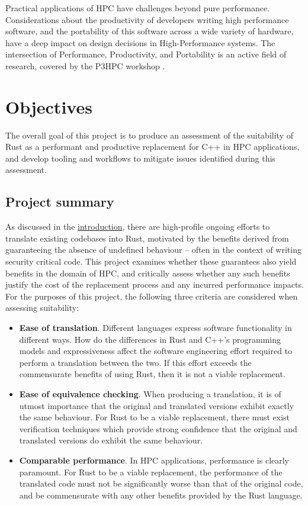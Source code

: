 Practical applications of \acrshort{HPC} have challenges beyond pure performance. Considerations about the productivity of developers writing high performance software, and the portability of this software across a wide variety of hardware, have a deep impact on design decisions in High-Performance systems. The intersection of Performance, Productivity, and Portability is an active field of research, covered by the \acrfull{P3HPC} workshop \cite{P3HPC}.



\section{Objectives}
\label{sec:objectives}

The overall goal of this project is to produce an assessment of the suitability of Rust as a performant and productive replacement for C++ in \acrshort{HPC} applications, and develop tooling and workflows to mitigate issues identified during this assessment.

\subsection{Project summary}
\label{ssec:objectives-summary}

As discussed in the \hyperref[ch:introduction]{introduction}, there are high-profile ongoing efforts to translate existing codebases into Rust, motivated by the benefits derived from guaranteeing the absence of undefined behaviour -- often in the context of writing security critical code. This project examines whether these guarantees also yield benefits in the domain of \acrshort{HPC}, and critically assess whether any such benefits justify the cost of the replacement process and any incurred performance impacts. For the purposes of this project, the following three criteria are considered when assessing suitability:

\begin{itemize}
    \item \textbf{Ease of translation}. Different languages express software functionality in different ways. How do the differences in Rust and C++'s programming models and expressiveness affect the software engineering effort required to perform a translation between the two. If this effort exceeds the commensurate benefits of using Rust, then it is not a viable replacement.
    \item \textbf{Ease of equivalence checking}. When producing a translation, it is of utmost importance that the original and translated versions exhibit exactly the same behaviour. For Rust to be a viable replacement, there must exist verification techniques which provide strong confidence that the original and translated versions do exhibit the same behaviour.
    \item \textbf{Comparable performance}. In \acrshort{HPC} applications, performance is clearly paramount. For Rust to be a viable replacement, the performance of the translated code must not be significantly worse than that of the original code, and be commensurate with any other benefits provided by the Rust language.
\end{itemize}

